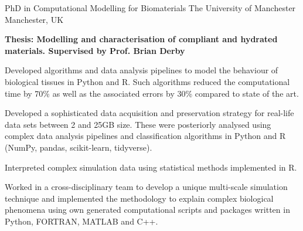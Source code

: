 


\begin{cventries}


\cventry
{PhD in Computational Modelling for Biomaterials}%
{The University of Manchester} %
{Manchester, UK} %
{} %
{ %
\begin{cvitems}
\item[]{\textbf{Thesis: Modelling and characterisation of compliant and hydrated materials. Supervised by Prof. Brian Derby}}
\item{ Developed algorithms and data analysis pipelines to model the behaviour of biological tissues in Python and R. Such algorithms reduced  the computational time by 70\% as well as the associated errors by 30\% compared to state of the art.}
\item{Developed a sophisticated data acquisition and preservation strategy for real-life data sets between 2 and 25GB size. These were posteriorly analysed using complex data analysis pipelines and classification algorithms in Python and R (NumPy, pandas, scikit-learn, tidyverse).}
\item{Interpreted complex simulation data using statistical methods implemented in R.}
\item{ Worked in a cross-disciplinary team to develop a unique multi-scale simulation technique and implemented the methodology to explain complex biological phenomena using own generated computational scripts and packages written in Python, FORTRAN, MATLAB and C++.}

\end{cvitems}}
\end{cventries}
